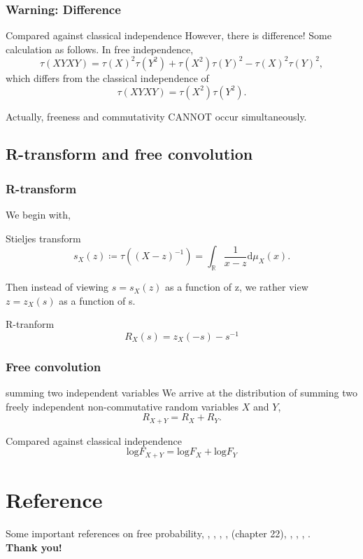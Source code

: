 \documentclass{beamer}
\begin{document}
\begin{frame}
\frametitle{Warning: Difference}
\begin{block}{Compared against classical independence}
However, there is difference! Some calculation as follows. In free independence,
\[
\tau(XYXY)=\tau(X)^2\tau(Y^2)+\tau(X^2)\tau(Y)^2-\tau(X)^2\tau(Y)^2,
\]
which differs from the classical independence of 
\[
\tau(XYXY)=\tau(X^2)\tau(Y^2).
\]
\end{block}
Actually, freeness and commutativity CANNOT occur simultaneously.
\end{frame}

\subsection{R-transform and free convolution}
\begin{frame}
\frametitle{R-transform}
We begin with,
\begin{block}{Stieljes transform}
\[
s_X(z) \coloneqq \tau((X-z)^{-1}) = \int_{\mathbb{R}} \frac{1}{x-z}\text{d}\mu_X(x).
\]
\end{block}
Then instead of viewing $s=s_X(z)$ as a function of z, we rather view $z=z_X(s)$ as a function of s. 
\begin{block}{R-tranform}
\[
R_X(s) = z_X(-s)-s^{-1}
\]
\end{block}
\end{frame}

\begin{frame}
\frametitle{Free convolution}
\begin{block}{summing two independent variables}
We arrive at the distribution of summing two freely independent non-commutative random variables $X$ and $Y$,
\[
R_{X+Y} = R_{X}+R_{Y}.
\]
\end{block}
\begin{block}{Compared against classical independence}
\[
\text{log}F_{X+Y} = \text{log}F_X +\text{log}F_Y 
\]
\end{block}
\end{frame}
\medskip

\section{Reference}
\begin{frame}
Some important references on free probability,
\cite{tao2012topics}, \cite{shlyakhtenko2017random}, \cite{anderson2010introduction},  \cite{nica2006lectures},  \cite{akemann2011oxford}(chapter 22), \cite{mitchener2005non}, \cite{voiculescu1992free}, 
\cite{mingo2010free}, \cite{pielaszkiewicz2015closed}.\\

\textbf{Thank you!}

\end{frame}
\begin{frame}[allowframebreaks]


\end{frame}
\end{document}
